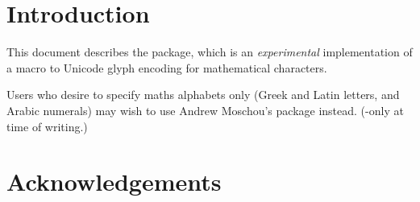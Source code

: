 
\begin{abstract}
\noindent
This document describes the  package, which is
intended as an implementation of Unicode
maths for \LaTeX\ using the \XeTeX\ and Lua\TeX\ typesetting engines.
With this package, changing maths fonts is as easy as changing
text fonts --- and there are more and more maths fonts appearing now.
Maths input can also be simplified with Unicode since literal glyphs may be
entered instead of control sequences in your document source.

The package provides support for both \XeTeX\ and Lua\TeX. The different
engines provide differing levels of support for Unicode maths.
Please let us know of any troubles.

Alongside this documentation file, you should be able to find a minimal
example demonstrating the use of the package,
`\texttt{unimath-example.ltx}'. It also comes with a separate document,
`\texttt{unimath-symbols.pdf}',
containing a complete listing of mathematical symbols defined by
, including comparisons between different fonts.

Finally, while the STIX fonts may be used with this package, accessing
their alphabets in their `private user area' is not yet supported.
(Of these additional alphabets there is a separate caligraphic design
distinct to the script design already included.)
Better support for the STIX fonts is planned for an upcoming revision of the
package after any problems have been ironed out with the initial version.

\end{abstract}

\newpage
\tableofcontents

\clearpage
\section{Introduction}

This document describes the  package, which is an
\emph{experimental} implementation of a macro to Unicode glyph encoding for
mathematical characters.

Users who desire to specify maths alphabets only (Greek and Latin letters,
and Arabic numerals)
may wish to use Andrew Moschou's  package instead.
(\XeTeX-only at time of writing.)

\section{Acknowledgements}

